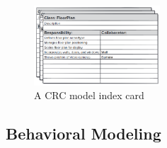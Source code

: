 \begin{figure}[!htb]
    \centering
    \includegraphics[width=0.42\textwidth]{pic/SE4/A CRC model index card}
    \caption{A CRC model index card}
\end{figure}

\subsection{Behavioral Modeling}
